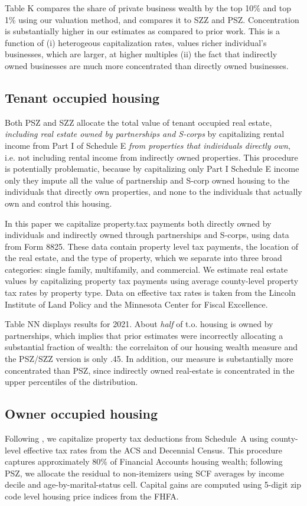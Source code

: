 \documentclass[12pt]{article}
\begin{document}
Table K compares the share of private business wealth by the top 10\% and top 1\% using our valuation method, and compares it to SZZ and PSZ. Concentration is substantially higher in our estimates as compared to prior work. This is a function of (i) heterogeous capitalization rates, values richer individual's businesses, which are larger, at higher multiples (ii) the fact that indirectly owned businesses are much more concentrated than directly owned businesses. 


\subsection{Tenant occupied housing}

Both PSZ and SZZ allocate the total value of tenant occupied real estate, \textit{including real estate owned by partnerships and S-corps} by capitalizing rental income from Part I of Schedule E \textit{from properties that individuals directly own}, i.e. not including rental income from indirectly owned properties. This procedure is potentially problematic, because by capitalizing only Part I Schedule E income only they impute all the value of partnership and S-corp owned housing to the individuals that directly own properties, and none to the individuals that actually own and control this housing. 

In this paper we capitalize property.tax payments both directly owned by individuals and indirectly owned through partnerships and S-corps, using data from Form 8825. These data contain property level tax payments, the location of the real estate, and the type of property, which we separate into three broad categories: single family, multifamily, and commercial. We estimate real estate values by capitalizing property tax payments using average county-level property tax rates by property type. Data on effective tax rates is taken from the Lincoln Institute of Land Policy and the Minnesota Center for Fiscal Excellence.

Table NN displays results for 2021. About \textit{half} of t.o. housing is owned by partnerships, which implies that prior estimates were incorrectly allocating a substantial fraction of wealth: the correlaiton of our housing wealth measure and the PSZ/SZZ version is only .45. In addition, our measure is substantially more concentrated than PSZ, since indirectly owned real-estate is concentrated in the upper percentiles of the distribution. 

\subsection{Owner occupied housing}
Following \citet{larrimore2021recent}, we capitalize property tax deductions from Schedule~A using county-level effective tax rates from the ACS and Decennial Census. This procedure captures approximately 80\% of Financial Accounts housing wealth; following PSZ, we allocate the residual to non-itemizers using SCF averages by income decile and age-by-marital-status cell. Capital gains are computed using 5-digit zip code level housing price indices from the FHFA. 
\end{document}
